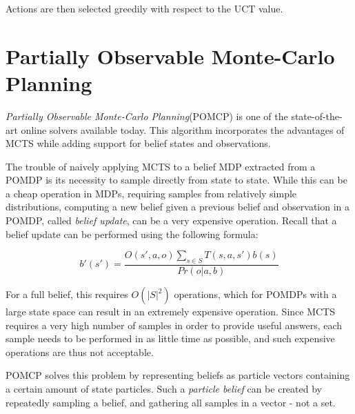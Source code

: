 Actions are then selected greedily with respect to the UCT value.

\section[]{Partially Observable Monte-Carlo Planning%
}
\label{ref:pomcp}

\textit{Partially Observable Monte-Carlo Planning}(POMCP) \cite{cit:pomcp} is one of the
state-of-the-art online solvers available today. This algorithm incorporates the advantages of MCTS
while adding support for belief states and observations.

The trouble of naively applying MCTS to a belief MDP extracted from a POMDP is its necessity to
sample directly from state to state. While this can be a cheap operation in MDPs, requiring
samples from relatively simple distributions, computing a new belief given a previous belief and
observation in a POMDP, called \textit{belief update}, can be a very expensive operation. Recall that a belief
update can be performed using the following formula:

\[ b'(s') = \frac{O(s', a, o)\sum_{s\in S}T(s,a,s')b(s)}{Pr(o|a,b)} \]

For a full belief, this requires $O(|S|^2)$ operations, which for POMDPs with a large state space
can result in an extremely expensive operation. Since MCTS requires a very high number of samples in
order to provide useful answers, each sample needs to be performed in as little time as possible,
and such expensive operations are thus not acceptable.

POMCP solves this problem by representing beliefs as particle vectors containing a certain amount of
state particles. Such a \textit{particle belief} can be created by repeatedly sampling a belief, and
gathering all samples in a vector - not a set.

